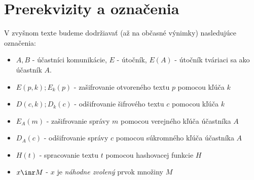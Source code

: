 \section{Prerekvizity a označenia}


V zvyšnom texte budeme dodržiavať (až na občasné výnimky) nasledujúce
označenia:
\begin{itemize}
\item $A,B$ - účastníci komunikácie, $E$ - útočník, $E(A)$ - útočník
            tváriaci sa ako účastník $A$.
\item $E(p,k); E_k(p)$ - zašifrovanie otvoreného textu $p$ pomocou kľúča $k$
\item $D(c,k); D_k(c)$ - odšifrovanie šifrového textu $c$ pomocou kľúča $k$
\item $E_A(m)$ - zašifrovanie správy $m$ pomocou verejného kľúča účastníka $A$
\item $D_A(c)$ - odšifrovanie správy $c$ pomocou súkromného kľúča účastníka $A$
\item $H(t)$ - spracovanie textu $t$ pomocou hashovacej funkcie $H$
\item $x \inr M$ - $x$ je \emph{náhodne zvolený} prvok množiny $M$
\end{itemize}
